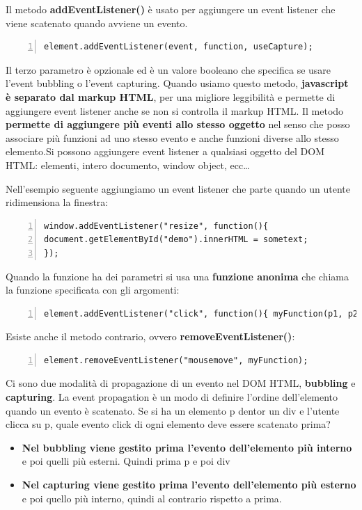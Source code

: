 Il metodo \textbf{addEventListener()} è usato per aggiungere un event listener che viene scatenato quando avviene un evento. 
\begin{Verbatim}[numbers = left, frame = single]
element.addEventListener(event, function, useCapture);
\end{Verbatim}
Il terzo parametro è opzionale ed è un valore booleano che specifica se usare l'event bubbling o l'event capturing. Quando usiamo questo metodo, \textbf{javascript è separato dal markup HTML}, per una migliore leggibilità e permette di aggiungere event listener anche se non si controlla il markup HTML. Il metodo \textbf{permette di aggiungere più eventi allo stesso oggetto} nel senso che posso associare più funzioni ad uno stesso evento e anche funzioni diverse allo stesso elemento.Si possono aggiungere event listener a qualsiasi oggetto del DOM HTML: elementi, intero documento, window object, ecc\dots

Nell'esempio seguente aggiungiamo un event listener che parte quando un utente ridimensiona la finestra:
\begin{Verbatim}[numbers = left, frame = single]
window.addEventListener("resize", function(){
document.getElementById("demo").innerHTML = sometext;
});
\end{Verbatim}
Quando la funzione ha dei parametri si usa una \textbf{funzione anonima} che chiama la funzione specificata con gli argomenti:
\begin{Verbatim}[numbers = left, frame = single]
element.addEventListener("click", function(){ myFunction(p1, p2); });
\end{Verbatim}


Esiste anche il metodo contrario, ovvero \textbf{removeEventListener()}:
\begin{Verbatim}[numbers = left, frame = single]
element.removeEventListener("mousemove", myFunction);
\end{Verbatim}

Ci sono due modalità di propagazione di un evento nel DOM HTML, \textbf{bubbling} e \textbf{capturing}. La event propagation è un modo di definire l'ordine dell'elemento quando un evento è scatenato. Se si ha un elemento p dentor un div e l'utente clicca su p, quale evento click di ogni elemento deve essere scatenato prima? 
\begin{itemize}
    \item \textbf{Nel bubbling viene gestito prima l'evento dell'elemento più interno} e poi quelli più esterni. Quindi prima p e poi div
    \item \textbf{Nel capturing viene gestito prima l'evento dell'elemento più esterno} e poi quello più interno, quindi al contrario rispetto a prima.
\end{itemize}


